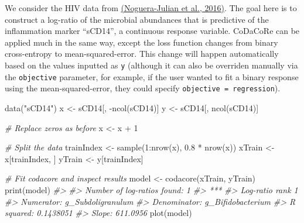 \documentclass[
]{article}
\newenvironment{Shaded}{\begin{snugshade}}{\end{snugshade}}
\newcommand{\CommentTok}[1]{\textcolor[rgb]{0.56,0.35,0.01}{\textit{#1}}}
\newcommand{\DecValTok}[1]{\textcolor[rgb]{0.00,0.00,0.81}{#1}}
\newcommand{\FloatTok}[1]{\textcolor[rgb]{0.00,0.00,0.81}{#1}}
\newcommand{\FunctionTok}[1]{\textcolor[rgb]{0.00,0.00,0.00}{#1}}
\newcommand{\NormalTok}[1]{#1}
\newcommand{\OtherTok}[1]{\textcolor[rgb]{0.56,0.35,0.01}{#1}}
\newcommand{\SpecialCharTok}[1]{\textcolor[rgb]{0.00,0.00,0.00}{#1}}
\newcommand{\StringTok}[1]{\textcolor[rgb]{0.31,0.60,0.02}{#1}}
\begin{document}
We consider the HIV data from
\href{http://dx.doi.org/10.1016/j.ebiom.2016.01.032}{(Noguera-Julian et
al., 2016)}. The goal here is to construct a log-ratio of the microbial
abundances that is predictive of the inflammation marker ``sCD14'', a
continuous response variable. CoDaCoRe can be applied much in the same
way, except the loss function changes from binary cross-entropy to
mean-squared-error. This change will happen automatically based on the
values inputted as \texttt{y} (although it can also be overriden
manually via the \texttt{objective} parameter, for example, if the user
wanted to fit a binary response using the mean-squared-error, they could
specify
\texttt{objective\ =\ \textquotesingle{}regression\textquotesingle{}}).

\begin{Shaded}
\begin{Highlighting}[]
\FunctionTok{data}\NormalTok{(}\StringTok{"sCD14"}\NormalTok{)}
\NormalTok{x }\OtherTok{\textless{}{-}}\NormalTok{ sCD14[, }\SpecialCharTok{{-}}\FunctionTok{ncol}\NormalTok{(sCD14)]}
\NormalTok{y }\OtherTok{\textless{}{-}}\NormalTok{ sCD14[, }\FunctionTok{ncol}\NormalTok{(sCD14)]}

\CommentTok{\# Replace zeros as before}
\NormalTok{x }\OtherTok{\textless{}{-}}\NormalTok{ x }\SpecialCharTok{+} \DecValTok{1}

\CommentTok{\# Split the data}
\NormalTok{trainIndex }\OtherTok{\textless{}{-}} \FunctionTok{sample}\NormalTok{(}\DecValTok{1}\SpecialCharTok{:}\FunctionTok{nrow}\NormalTok{(x), }\FloatTok{0.8} \SpecialCharTok{*} \FunctionTok{nrow}\NormalTok{(x))}
\NormalTok{xTrain }\OtherTok{\textless{}{-}}\NormalTok{ x[trainIndex, ]}
\NormalTok{yTrain }\OtherTok{\textless{}{-}}\NormalTok{ y[trainIndex]}

\CommentTok{\# Fit codacore and inspect results}
\NormalTok{model }\OtherTok{\textless{}{-}} \FunctionTok{codacore}\NormalTok{(xTrain, yTrain)}
\FunctionTok{print}\NormalTok{(model)}
\CommentTok{\#\textgreater{} }
\CommentTok{\#\textgreater{} Number of log{-}ratios found: 1}
\CommentTok{\#\textgreater{} ***}
\CommentTok{\#\textgreater{} Log{-}ratio rank 1}
\CommentTok{\#\textgreater{} Numerator: g\_Subdoligranulum}
\CommentTok{\#\textgreater{} Denominator: g\_Bifidobacterium}
\CommentTok{\#\textgreater{} R squared: 0.1438051}
\CommentTok{\#\textgreater{} Slope: 611.0956}
\FunctionTok{plot}\NormalTok{(model)}
\end{Highlighting}
\end{Shaded}
\end{document}
